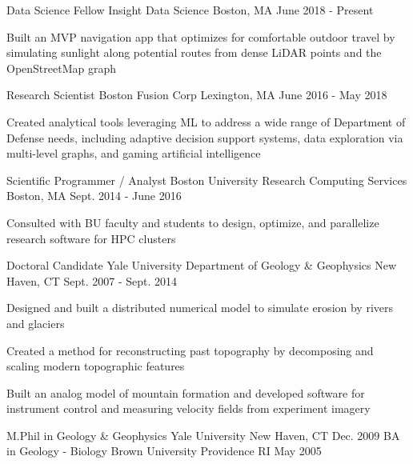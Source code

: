 \documentclass[11pt, a4paper]{awesome-cv}
\begin{document}
\begin{cventries}
  \cventrytight
    {Data Science Fellow}
    {Insight Data Science}
    {Boston, MA}
    {June 2018 - Present}
    {
    \begin{cvitems}
      \item Built an MVP navigation app that optimizes for comfortable outdoor travel by simulating sunlight along potential routes from dense LiDAR points and the OpenStreetMap graph
    \end{cvitems}
    }

  \cventrytight
    {Research Scientist}
    {Boston Fusion Corp}
    {Lexington, MA}
    {June 2016 - May 2018}
    {
      \begin{cvitems}
        \item {Created analytical tools leveraging ML to address a wide range of Department of Defense needs, including adaptive decision support systems, data exploration via multi-level graphs, and gaming artificial intelligence}
      \end{cvitems}
    }

  \cventrytight
    {Scientific Programmer / Analyst}
    {Boston University Research Computing Services}
    {Boston, MA}
    {Sept. 2014 - June 2016}
    {
      \begin{cvitems}
        \item {Consulted with BU faculty and students to design, optimize, and parallelize research software for HPC clusters} 
      \end{cvitems}
    }

  \cventrytight
    {Doctoral Candidate}
    {Yale University Department of Geology \& Geophysics}
    {New Haven, CT}
    {Sept. 2007 - Sept. 2014}
    {
      \begin{cvitems}
        \item {Designed and built a distributed numerical model to simulate erosion by rivers and glaciers}
        \item {Created a method for reconstructing past topography by decomposing and scaling modern topographic features}
        \item {Built an analog model of mountain formation and developed software for instrument control and measuring velocity fields from experiment imagery}
      \end{cvitems} 
    }

\end{cventries}

\begin{cventries}
  \cventry
    {M.Phil in Geology \& Geophysics}
    {Yale University}
    {New Haven, CT}
    {Dec. 2009}
    {}
  \cventry
    {BA in Geology - Biology}
    {Brown University}
    {Providence RI}
    {May 2005}
    {}
\end{cventries}
\end{document}
